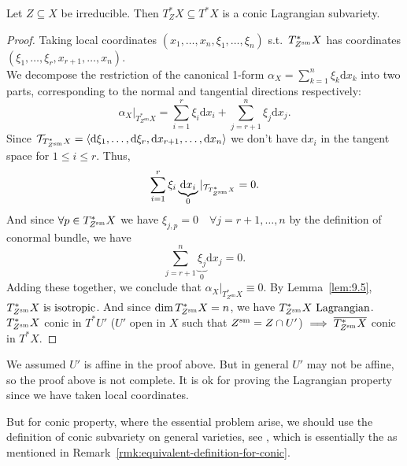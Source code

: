 \begin{corollary}
    Let $Z\subseteq X$ be irreducible.  Then $T^\ast_Z X\subseteq T^\ast X$ is a
    conic Lagrangian subvariety.
\end{corollary}
\begin{proof}
    Taking local coordinates $(x_1, \dots, x_n, \xi_1, \dots, \xi_n)$
    s.t.\ $T^{\ast}_{Z^{\mathrm{sm}}} X$ has coordinates $(\xi_1, \dots, \xi_r, x_{r+1}, \dots, x_n)$.\\

    We decompose the restriction of the canonical 1-form $\alpha_X = \sum_{k=1}^n \xi_k \text{d}x_k$ into two parts, corresponding to the normal and tangential directions respectively:
    \[
        \alpha_X|_{T^{\ast}_{Z^{\mathrm{sm}}}X} = \sum_{i=1}^r \xi_i \text{d}x_i + \sum_{j=r+1}^n \xi_j \text{d}x_j.
    \]
    Since $\mathcal{T}_{T^{\ast}_{Z^{\mathrm{sm}}} X} = \langle \text{d}\xi_1, \dots, \text{d}\xi_r, \text{d}x_{r+1}, \dots, \text{d}x_n \rangle$ we don't have $\text{d}x_i$ in the tangent space for $1 \le i \le r$. Thus,
    \[
        \sum_{i=1}^r \xi_i \underbrace{\text{d}x_i}_{0}|_{\mathcal{T}_{T^{\ast}_{Z^{\mathrm{sm}}} X}} = 0.
    \]
    And since $\forall p \in T^{\ast}_{Z^{\mathrm{sm}}} X$ we have $\xi_{j,p} = 0 \quad \forall j = r+1, \dots, n$ by the definition of conormal bundle, we have
    \[
        \sum_{j=r+1}^n \underbrace{\xi_j}_{0} \text{d}x_j = 0.
    \]
    Adding these together, we conclude that $\alpha_X|_{T^{\ast}_{Z^{\mathrm{sm}}}X} \equiv 0$.
    By Lemma~\ref{lem:9.5}, $T^{\ast}_{Z^{\mathrm{sm}}} X \text{ is isotropic}$. And since $\dim T^{\ast}_{Z^{\mathrm{sm}}} X = n$, we have $T^{\ast}_{Z^{\mathrm{sm}}} X \text{ Lagrangian}$.\\

    $T^{\ast}_{Z^{\mathrm{sm}}} X$ conic in $T^{\ast}U'$ ($U'$ open in $X$ such that $Z^{\mathrm{sm}} = Z \cap U'$) $\implies \overline{T^{\ast}_{Z^{\mathrm{sm}}} X}$ conic in $T^{\ast}X$.
\end{proof}

\begin{remark}
    We assumed $U'$ is affine in the proof above. But in general $U'$ may not be affine, so the proof above is not complete.
    It is ok for proving the Lagrangian property since we have taken local coordinates.

    But for conic property, where the essential problem arise, we should use the definition of conic subvariety on general varieties, see \cite[Chapter 2.2]{hotta2008d}, which is essentially the as mentioned in Remark~\ref{rmk:equivalent-definition-for-conic}.
\end{remark}


